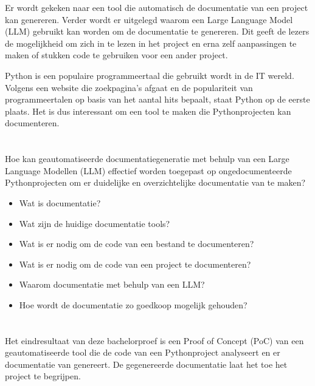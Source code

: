 Er wordt gekeken naar een tool die automatisch de documentatie van een project kan genereren.
Verder wordt er uitgelegd waarom een Large Language Model (LLM) gebruikt kan worden om de documentatie te genereren.
Dit geeft de lezers de mogelijkheid om zich in te lezen in het project en erna zelf aanpassingen te maken of stukken code te gebruiken voor een ander project.

Python is een populaire programmeertaal die gebruikt wordt in de IT wereld.
Volgens \textcite{TIOBE2024} een website die zoekpagina's afgaat en de populariteit van programmeertalen op basis van het aantal hits bepaalt, staat Python op de eerste plaats.
Het is dus interessant om een tool te maken die Pythonprojecten kan documenteren.

\section{}%
\label{sec:onderzoeksvraag}

Hoe kan geautomatiseerde documentatiegeneratie met behulp van een Large Language Modellen (LLM) effectief worden toegepast op ongedocumenteerde Pythonprojecten om er duidelijke en overzichtelijke documentatie van te maken? 

\begin{itemize}
  \item Wat is documentatie?
  \item Wat zijn de huidige documentatie tools?
  \item Wat is er nodig om de code van een bestand te documenteren?
  \item Wat is er nodig om de code van een project te documenteren?
  \item Waarom documentatie met behulp van een LLM?
  \item Hoe wordt de documentatie zo goedkoop mogelijk gehouden?
\end{itemize}

\section{}%
\label{sec:onderzoeksdoelstelling}

Het eindresultaat van deze bachelorproef is een Proof of Concept (PoC) van een geautomatiseerde tool die de code van een Pythonproject analyseert en er documentatie van genereert.
De gegenereerde documentatie laat het toe het project te begrijpen.

